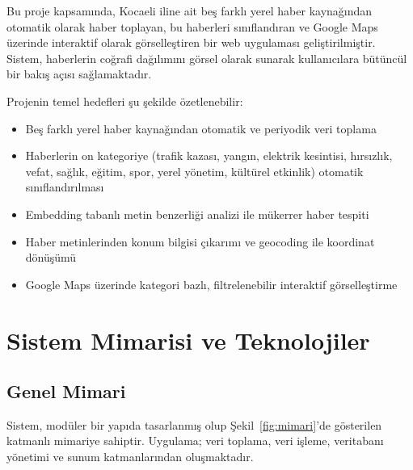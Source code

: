 \documentclass[conference]{IEEEtran}
\begin{document}
Bu proje kapsamında, Kocaeli iline ait beş farklı yerel haber kaynağından otomatik olarak haber toplayan, bu haberleri sınıflandıran ve Google Maps üzerinde interaktif olarak görselleştiren bir web uygulaması geliştirilmiştir. Sistem, haberlerin coğrafi dağılımını görsel olarak sunarak kullanıcılara bütüncül bir bakış açısı sağlamaktadır.

Projenin temel hedefleri şu şekilde özetlenebilir:
\begin{itemize}
    \item Beş farklı yerel haber kaynağından otomatik ve periyodik veri toplama
    \item Haberlerin on kategoriye (trafik kazası, yangın, elektrik kesintisi, hırsızlık, vefat, sağlık, eğitim, spor, yerel yönetim, kültürel etkinlik) otomatik sınıflandırılması
    \item Embedding tabanlı metin benzerliği analizi ile mükerrer haber tespiti
    \item Haber metinlerinden konum bilgisi çıkarımı ve geocoding ile koordinat dönüşümü
    \item Google Maps üzerinde kategori bazlı, filtrelenebilir interaktif görselleştirme
\end{itemize}

\section{Sistem Mimarisi ve Teknolojiler}

\subsection{Genel Mimari}

Sistem, modüler bir yapıda tasarlanmış olup Şekil~\ref{fig:mimari}'de gösterilen katmanlı mimariye sahiptir. Uygulama; veri toplama, veri işleme, veritabanı yönetimi ve sunum katmanlarından oluşmaktadır.
\end{document}
